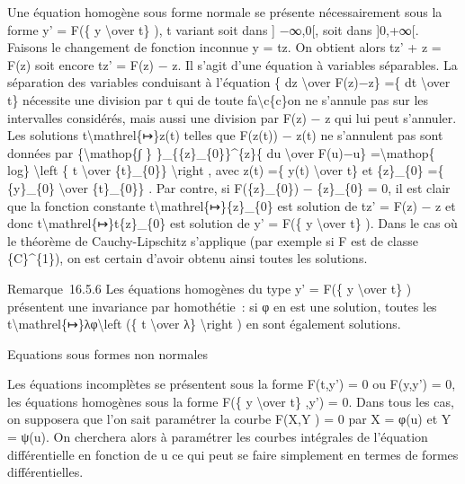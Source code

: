 \documentclass[]{article}
\begin{document}
Une équation homogène sous forme normale se présente nécessairement sous
la forme y' = F(\{ y \textbackslash{}over t\} ), t variant soit dans {]}
−∞,0{[}, soit dans {]}0,+∞{[}. Faisons le changement de fonction
inconnue y = tz. On obtient alors tz' + z = F(z) soit encore tz' = F(z)
− z. Il s'agit d'une équation à variables séparables. La séparation des
variables conduisant à l'équation \{ dz \textbackslash{}over F(z)−z\}
=\{ dt \textbackslash{}over t\} nécessite une division par t qui de
toute fa\textbackslash{}c\{c\}on ne s'annule pas sur les intervalles
considérés, mais aussi une division par F(z) − z qui lui peut s'annuler.
Les solutions t\textbackslash{}mathrel\{↦\}z(t) telles que F(z(t)) −
z(t) ne s'annulent pas sont données par \{\textbackslash{}mathop\{∫ \}
\}\_\{\{z\}\_\{0\}\}\^{}\{z\}\{ du \textbackslash{}over F(u)−u\}
=\textbackslash{}mathop\{ log\} \textbackslash{}left \textbar{}\{ t
\textbackslash{}over \{t\}\_\{0\}\} \textbackslash{}right \textbar{},
avec z(t) =\{ y(t) \textbackslash{}over t\} et \{z\}\_\{0\} =\{
\{y\}\_\{0\} \textbackslash{}over \{t\}\_\{0\}\} . Par contre, si
F(\{z\}\_\{0\}) − \{z\}\_\{0\} = 0, il est clair que la fonction
constante t\textbackslash{}mathrel\{↦\}\{z\}\_\{0\} est solution de tz'
= F(z) − z et donc t\textbackslash{}mathrel\{↦\}t\{z\}\_\{0\} est
solution de y' = F(\{ y \textbackslash{}over t\} ). Dans le cas où le
théorème de Cauchy-Lipschitz s'applique (par exemple si F est de classe
\{C\}\^{}\{1\}), on est certain d'avoir obtenu ainsi toutes les
solutions.

Remarque~16.5.6 Les équations homogènes du type y' = F(\{ y
\textbackslash{}over t\} ) présentent une invariance par homothétie~: si
φ en est une solution, toutes les
t\textbackslash{}mathrel\{↦\}λφ\textbackslash{}left (\{ t
\textbackslash{}over λ\} \textbackslash{}right ) en sont également
solutions.

Equations sous formes non normales

Les équations incomplètes se présentent sous la forme F(t,y') = 0 ou
F(y,y') = 0, les équations homogènes sous la forme F(\{ y
\textbackslash{}over t\} ,y') = 0. Dans tous les cas, on supposera que
l'on sait paramétrer la courbe F(X,Y ) = 0 par X = φ(u) et Y = ψ(u). On
cherchera alors à paramétrer les courbes intégrales de l'équation
différentielle en fonction de u ce qui peut se faire simplement en
termes de formes différentielles.
\end{document}

